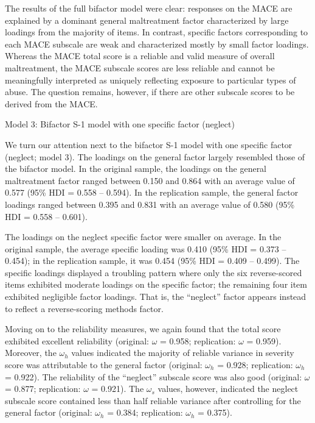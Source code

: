 \documentclass[letterpaper,man,natbib,floatsintext,longtable]{apa6}
\makeatletter
\renewcommand{\subsubsection}{\@startsection{subsubsection}{3}
  {\z@}%
  {\b@level@two@skip}{\e@level@two@skip}%
  {\normalfont\normalsize\bfseries}}
\makeatother
\begin{document}
The results of the full bifactor model were clear: responses on the MACE are explained by a dominant general maltreatment factor characterized by large loadings from the majority of items. In contrast, specific factors corresponding to each MACE subscale are weak and characterized mostly by small factor loadings. Whereas the MACE total score is a reliable and valid measure of overall maltreatment, the MACE subscale scores are less reliable and cannot be meaningfully interpreted as uniquely reflecting exposure to particular types of abuse. The question remains, however, if there are other subscale scores to be derived from the MACE. 

\subsubsection{Model 3: Bifactor S-1 model with one specific factor (neglect)}

We turn our attention next to the bifactor S-1 model with one specific factor (neglect; model 3). The loadings on the general factor largely resembled those of the bifactor model. In the original sample, the loadings on the general maltreatment factor ranged between 0.150 and 0.864 with an average value of 0.577 (95\% HDI = 0.558 -- 0.594). In the replication sample, the general factor loadings ranged between 0.395 and 0.831 with an average value of 0.580 (95\% HDI = 0.558 -- 0.601). 

The loadings on the neglect specific factor were smaller on average. In the original sample, the average specific loading was 0.410 (95\% HDI = 0.373 -- 0.454); in the replication sample, it was 0.454 (95\% HDI = 0.409 -- 0.499). The specific loadings displayed a troubling pattern where only the six reverse-scored items exhibited moderate loadings on the specific factor; the remaining four item exhibited negligible factor loadings. That is, the ``neglect'' factor appears instead to reflect a reverse-scoring methods factor.

Moving on to the reliability measures, we again found that the total score exhibited excellent reliability (original: $\omega$ = 0.958; replication: $\omega$ = 0.959). Moreover, the $\omega_h$ values indicated the majority of reliable variance in severity score was attributable to the general factor (original: $\omega_h$ = 0.928; replication: $\omega_h$ = 0.922). The reliability of the ``neglect'' subscale score was also good (original: $\omega$ = 0.877; replication: $\omega$ = 0.921). The $\omega_s$ values, however, indicated the neglect subscale score contained less than half reliable variance after controlling for the general factor (original: $\omega_h$ = 0.384; replication: $\omega_h$ = 0.375). 
\end{document}
